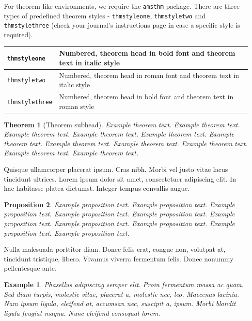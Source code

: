 \documentclass[unnumsec,webpdf,modern,large]{mam-authoring-template}%
\theoremstyle{thmstyleone}%
\newtheorem{theorem}{Theorem}%
\newtheorem{proposition}[theorem]{Proposition}%
\theoremstyle{thmstyletwo}%
\newtheorem{example}{Example}%
\theoremstyle{thmstylethree}%
\begin{document}
For theorem-like environments, we require the \verb+amsthm+ package. There are three types of predefined theorem styles - \verb+thmstyleone+, \verb+thmstyletwo+ and \verb+thmstylethree+   (check your journal's instructions page in case a specific style is required).

\medskip
\noindent\begin{tabular}{|l|p{13pc}|}
\hline
\verb+thmstyleone+ & Numbered, theorem head in bold font and theorem text in italic style \\\hline
\verb+thmstyletwo+ & Numbered, theorem head in roman font and theorem text in italic style \\\hline
\verb+thmstylethree+ & Numbered, theorem head in bold font and theorem text in roman style \\\hline
\end{tabular}


\begin{theorem}[Theorem subhead]\label{thm1}
Example theorem text. Example theorem text. Example theorem text. Example theorem text. Example theorem text.
Example theorem text. Example theorem text. Example theorem text. Example theorem text. Example theorem text.
Example theorem text.
\end{theorem}

Quisque ullamcorper placerat ipsum. Cras nibh. Morbi vel justo vitae lacus tincidunt ultrices. Lorem ipsum dolor sit
amet, consectetuer adipiscing elit. In hac habitasse platea dictumst. Integer tempus convallis augue.

\begin{proposition}
Example proposition text. Example proposition text. Example proposition text. Example proposition text. Example proposition text.
Example proposition text. Example proposition text. Example proposition text. Example proposition text. Example proposition text.
\end{proposition}

Nulla malesuada porttitor diam. Donec felis erat, congue non, volutpat at, tincidunt tristique, libero. Vivamus
viverra fermentum felis. Donec nonummy pellentesque ante.

\begin{example}
Phasellus adipiscing semper elit. Proin fermentum massa
ac quam. Sed diam turpis, molestie vitae, placerat a, molestie nec, leo. Maecenas lacinia. Nam ipsum ligula, eleifend
at, accumsan nec, suscipit a, ipsum. Morbi blandit ligula feugiat magna. Nunc eleifend consequat lorem.
\end{example}
\end{document}
